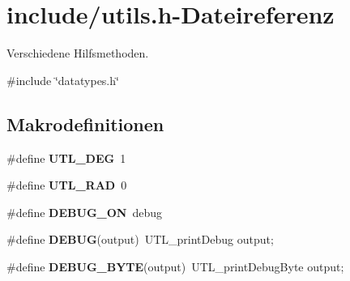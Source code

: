 \section{include/utils.h-\/Dateireferenz}
\label{utils_8h}


Verschiedene Hilfsmethoden.  


{\ttfamily \#include \char`\"{}datatypes.h\char`\"{}}\par
\subsection*{Makrodefinitionen}
\begin{DoxyCompactItemize}
\item 
\#define {\bf UTL\_\-DEG}~1
\item 
\#define {\bf UTL\_\-RAD}~0
\item 
\#define {\bf DEBUG\_\-ON}~debug
\item 
\#define {\bf DEBUG}(output)~UTL\_\-printDebug output;
\item 
\#define {\bf DEBUG\_\-BYTE}(output)~UTL\_\-printDebugByte output;
\end{DoxyCompactItemize}
